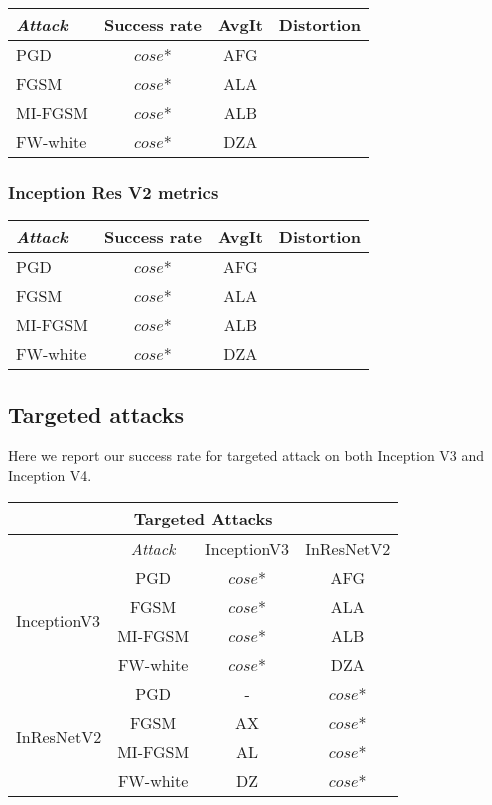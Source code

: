 \documentclass[10pt,twocolumn,letterpaper, english]{article}
\theoremstyle{definition}
\theoremstyle{plain}
\theoremstyle{plain}
\theoremstyle{plain}
\theoremstyle{plain}
\theoremstyle{remark}
\theoremstyle{remark}
\theoremstyle{definition}
\theoremstyle{definition}
\theoremstyle{definition}
\theoremstyle{definition}
\begin{document}
\begin{center}
    

\begin{tabular}{ |l|c|c|c| }
 \hline
  \textit{Attack} & Success rate & AvgIt & Distortion \\
 \hline
 
 PGD   & $cose$*   &  AFG &\\
 FGSM&   $cose$*  & ALA  &  \\
 MI-FGSM & $cose$* & ALB &\\
 FW-white & $cose$* & DZA &\\
\hline
\end{tabular}
\end{center}


\subsubsection{Inception Res V2 metrics}

\begin{center}
    

\begin{tabular}{ |l|c|c|c| }
 \hline
  \textit{Attack} & Success rate & AvgIt & Distortion \\
 \hline
 
 PGD   & $cose$*   &  AFG &\\
 FGSM&   $cose$*  & ALA  &  \\
 MI-FGSM & $cose$* & ALB &\\
 FW-white & $cose$* & DZA &\\
\hline
\end{tabular}
\end{center}

\subsection{Targeted attacks}

Here we report our success rate for targeted attack on both Inception V3 and Inception V4.\\

\begin{tabular}{ |l|c|c|c| }
 \hline
 \multicolumn{4}{|c|}{Targeted Attacks} \\
 \hline
  & \textit{Attack} & InceptionV3 & InResNetV2 \\
 \hline
 
 \multirow{4}{5em}{InceptionV3} & PGD   & $cose$*   &  AFG\\
 & FGSM&   $cose$*  & ALA   \\
 & MI-FGSM & $cose$* & ALB\\
 & FW-white & $cose$* & DZA\\

 \hline
 \multirow{4}{5em}{InResNetV2} & PGD   & -   &  $cose$*\\
 & FGSM&   AX  & $cose$*   \\
 & MI-FGSM &AL & $cose$*\\
 & FW-white &DZ & $cose$*\\
 \hline
\end{tabular}
\end{document}
